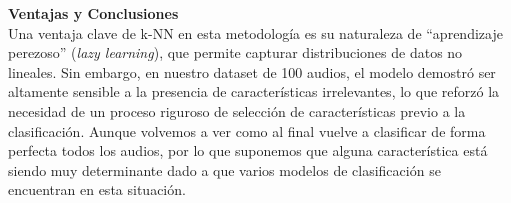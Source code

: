 \textbf{Ventajas y Conclusiones} \\
Una ventaja clave de k-NN en esta metodología es su naturaleza de ``aprendizaje perezoso'' (\textit{lazy learning}), que permite capturar distribuciones de datos no lineales. Sin embargo, en nuestro dataset de 100 audios, el modelo demostró ser altamente sensible a la presencia de características irrelevantes, lo que reforzó la necesidad de un proceso riguroso de selección de características previo a la clasificación. Aunque volvemos a ver como al final vuelve a clasificar de forma perfecta todos los audios, por lo que suponemos que alguna característica está siendo muy determinante dado a que varios modelos de clasificación se encuentran en esta situación.